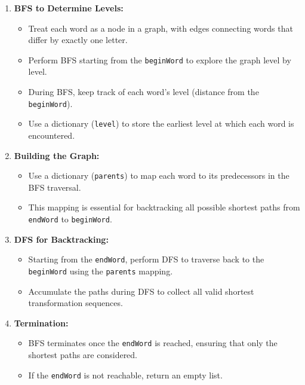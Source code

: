 \begin{enumerate}
    \item \textbf{BFS to Determine Levels:}
    \begin{itemize}
        \item Treat each word as a node in a graph, with edges connecting words that differ by exactly one letter.
        \item Perform BFS starting from the \texttt{beginWord} to explore the graph level by level.
        \item During BFS, keep track of each word's level (distance from the \texttt{beginWord}).
        \item Use a dictionary (\texttt{level}) to store the earliest level at which each word is encountered.
    \end{itemize}
    
    \item \textbf{Building the Graph:}
    \begin{itemize}
        \item Use a dictionary (\texttt{parents}) to map each word to its predecessors in the BFS traversal.
        \item This mapping is essential for backtracking all possible shortest paths from \texttt{endWord} to \texttt{beginWord}.
    \end{itemize}
    
    \item \textbf{DFS for Backtracking:}
    \begin{itemize}
        \item Starting from the \texttt{endWord}, perform DFS to traverse back to the \texttt{beginWord} using the \texttt{parents} mapping.
        \item Accumulate the paths during DFS to collect all valid shortest transformation sequences.
    \end{itemize}
    
    \item \textbf{Termination:}
    \begin{itemize}
        \item BFS terminates once the \texttt{endWord} is reached, ensuring that only the shortest paths are considered.
        \item If the \texttt{endWord} is not reachable, return an empty list.
    \end{itemize}
\end{enumerate}


